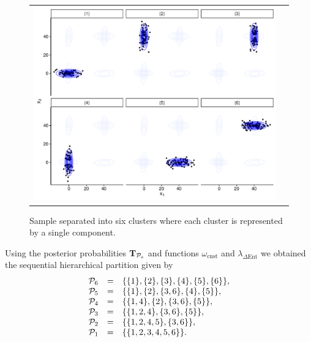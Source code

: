\documentclass[submit]{smj}
\theoremstyle{definition}
\begin{document}
\begin{figure}[h]
\begin{center}
\begin{tabular}{cc}
  \includegraphics[width=\textwidth]{figures/partition-example-part6.pdf} \\
 \end{tabular}
 \caption{Sample separated into six clusters where each cluster is represented by a single component.}\label{ex_one_one}
\end{center}
\end{figure}

Using the posterior probabilities $\text{\textbf{T}}_{\mathcal{P}_s}$ and functions $\omega_{\text{cnst}}$ and $\lambda_{\Delta\text{Ent}}$ we obtained the sequential hierarchical partition given by 
\begin{equation}
\begin{array}{r c l}
\mathcal{P}_6 &=& \{\{1\},\{2\},\{3\},\{4\},\{5\},\{6\}\},\\
\mathcal{P}_5 &=& \{\{1\},\{2\}, \{3, 6\},\{4\},\{5\} \},\\
\mathcal{P}_4 &=& \{\{1, 4\},\{2\}, \{3, 6\}, \{5\} \}, \\
\mathcal{P}_3 &=& \{\{1, 2, 4\}, \{3, 6\}, \{5\} \}, \\
\mathcal{P}_2 &=& \{\{1, 2 , 4, 5\}, \{3, 6\} \},  \\
\mathcal{P}_1 &=& \{\{1, 2, 3, 4, 5, 6\}\}.
\end{array}
\label{hier_ex}
\end{equation}
\end{document}
